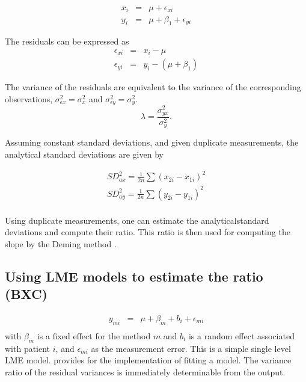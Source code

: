 \documentclass[12pt, a4paper]{report}
\theoremstyle{plain}
\theoremstyle{definition}
\theoremstyle{remark}
\begin{document}
\begin{eqnarray*}
	x_{i} &=& \mu + \epsilon_{xi}\\
	y_{i} &=& \mu +  \beta_{1} + \epsilon_{yi}
\end{eqnarray*}

The residuals can be expressed as
\begin{eqnarray*}
	\epsilon_{xi} &=& x_{i} - \mu  \\
	\epsilon_{yi} &=& y_{i} - (\mu + \beta_{1}) 
\end{eqnarray*}

The variance of the residuals are equivalent to the variance of the corresponding observations, $\sigma^{2}_{\epsilon x} =
\sigma^{2}_{x}$ and $\sigma^{2}_{\epsilon y} = \sigma^{2}_{y}$.
\begin{equation}
\lambda = \frac{\sigma^{2}_{yx}}{\sigma^{2}_{y}}.
\end{equation}

Assuming constant standard deviations, and given duplicate measurements, the analytical standard deviations are given by

\begin{eqnarray*}
	SD^{2}_{ax} = \frac{1}{2n} \sum (x_{2i} - x_{1i})^{2}\\
	SD^{2}_{ay} = \frac{1}{2n} \sum (y_{2i} - y_{1i})^{2}\\
\end{eqnarray*}

Using duplicate measurements, one can estimate the analyticalstandard deviations and compute their ratio. This ratio is then used for computing the slope by the Deming method \citep{linnet98}.

\subsection{Using LME models to estimate the ratio (BXC) }
	
	\begin{eqnarray*}
		y_{mi} &=& \mu + \beta_{m} + b_{i} + \epsilon_{mi}\\
	\end{eqnarray*}
with $\beta_{m}$ is a fixed effect for the method $m$ and $b_{i}$ is a random effect associated with patient $i$, and
	$\epsilon_{mi}$ as the measurement error. This is a simple single level LME model. \citet{pb} provides for the implementation of fitting a model. The variance ratio of the residual variances is immediately determinable from the output. 
	
\end{document}
